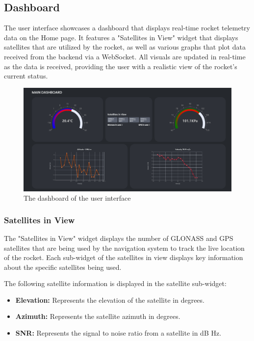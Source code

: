 
\subsectionfont{\fontsize{14}{14}\selectfont}
\graphicspath{{./images/}}


\subsection{Dashboard}
The user interface showcases a dashboard that displays real-time rocket telemetry data on the Home page. 
It features a "Satellites in View" widget that displays satellites that are utilized by the rocket, as well as 
various graphs that plot data received from the backend via a WebSocket. All visuals are updated in real-time as
the data is received, providing the user with a realistic view of the rocket's current status. 

\begin{figure}[H]
    \includegraphics [scale=0.75] {ui_dashboard}
    \centering
     {The dashboard of the user interface}
\end{figure}

\subsubsection {Satellites in View}
The "Satellites in View" widget displays the number of GLONASS and GPS satellites that are being used by the 
navigation system to track the live location of the rocket. Each sub-widget of the satellites in view displays key information
about the specific satellites being used.

The following satellite information is displayed in the satellite sub-widget:

\begin{itemize}
    \item \textbf{Elevation:} Represents the elevation of the satellite in degrees.
    \item \textbf{Azimuth:} Represents the satellite azimuth in degrees.
    \item \textbf{SNR:} Represents the signal to noise ratio from a satellite in dB Hz.
\end{itemize}

